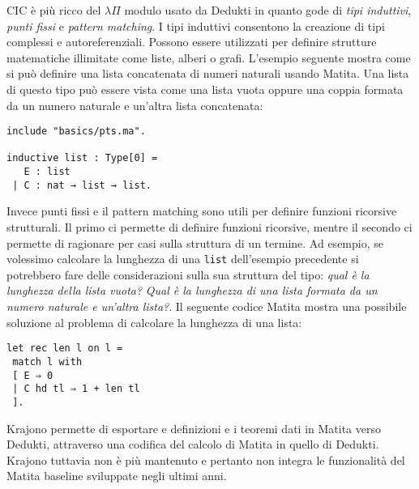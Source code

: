 \documentclass[12pt,a4paper]{report}
\begin{document}
\begin{prooftree}
\end{prooftree}

\begin{prooftree}
\end{prooftree}


CIC è più ricco del $\lambda\Pi$ modulo usato da Dedukti in quanto gode di 
\textit{tipi induttivi}, \textit{punti fissi} e \textit{pattern matching}.
I tipi induttivi consentono la creazione di tipi complessi e autoreferenziali.
Possono essere utilizzati per definire strutture matematiche illimitate come liste,
alberi o grafi. L'esempio seguente mostra come si può definire una lista concatenata
di numeri naturali usando Matita. Una lista di questo tipo può essere vista come
una lista vuota oppure una coppia formata da un numero naturale e un'altra lista 
concatenata:

\begin{lstlisting}
include "basics/pts.ma".

inductive list : Type[0] =
   E : list
 | C : nat → list → list.

\end{lstlisting}

Invece punti fissi e il pattern matching sono utili per definire funzioni ricorsive
strutturali. Il primo ci permette di definire funzioni ricorsive, mentre il secondo
ci permette di ragionare per casi sulla struttura di un termine. Ad esempio, se
volessimo calcolare la lunghezza di una \texttt{list} dell'esempio precedente
si potrebbero fare delle considerazioni sulla sua struttura del tipo: \textit{qual è
la lunghezza della lista vuota?} \textit{Qual è la lunghezza di una lista formata 
da un numero naturale e un'altra lista?}. Il seguente codice Matita mostra una possibile
soluzione al problema di calcolare la lunghezza di una lista:

\begin{lstlisting}
let rec len l on l =
 match l with
 [ E ⇒ 0
 | C hd tl ⇒ 1 + len tl
 ].
\end{lstlisting}

Krajono permette di esportare e definizioni
e i teoremi dati in Matita verso Dedukti, attraverso una codifica del calcolo
di Matita in quello di Dedukti. Krajono tuttavia non è più mantenuto e pertanto non integra
le funzionalità del Matita baseline sviluppate negli ultimi anni.
\end{document}
